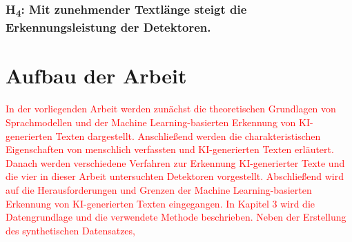 \hypertarget{hp:4}{
    \subsubsection{H\textsubscript{4}: Mit zunehmender Textlänge steigt die Erkennungsleistung der Detektoren.}
}

\section{Aufbau der Arbeit}
\textcolor{red}{In der vorliegenden Arbeit werden zunächst die theoretischen Grundlagen von Sprachmodellen und der Machine Learning-basierten Erkennung von KI-generierten Texten dargestellt. Anschließend werden die charakteristischen Eigenschaften von menschlich verfassten und KI-generierten Texten erläutert. Danach werden verschiedene Verfahren zur Erkennung KI-generierter Texte und die vier in dieser Arbeit untersuchten Detektoren vorgestellt. Abschließend wird auf die Herausforderungen und Grenzen der Machine Learning-basierten Erkennung von KI-generierten Texten eingegangen. In Kapitel 3 wird die Datengrundlage und die verwendete Methode beschrieben. Neben der Erstellung des synthetischen Datensatzes,}